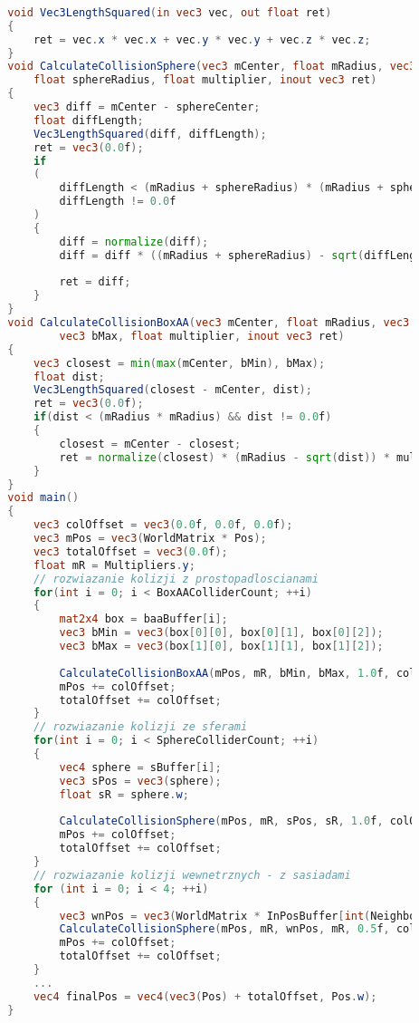 		\begin{lstlisting}[language=GLSL,caption={Rozwiązywanie kolizji.},label={lst_5_3}]
		
		void Vec3LengthSquared(in vec3 vec, out float ret)
		{
			ret = vec.x * vec.x + vec.y * vec.y + vec.z * vec.z;
		}
		void CalculateCollisionSphere(vec3 mCenter, float mRadius, vec3 sphereCenter, 
			float sphereRadius, float multiplier, inout vec3 ret)
		{
			vec3 diff = mCenter - sphereCenter;
			float diffLength;
			Vec3LengthSquared(diff, diffLength);
			ret = vec3(0.0f);
			if
			(
				diffLength < (mRadius + sphereRadius) * (mRadius + sphereRadius) &&
				diffLength != 0.0f
			)
			{
				diff = normalize(diff);
				diff = diff * ((mRadius + sphereRadius) - sqrt(diffLength)) * multiplier;
				
				ret = diff;
			}
		}
		void CalculateCollisionBoxAA(vec3 mCenter, float mRadius, vec3 bMin, 
				vec3 bMax, float multiplier, inout vec3 ret)
		{
			vec3 closest = min(max(mCenter, bMin), bMax);
			float dist;
			Vec3LengthSquared(closest - mCenter, dist);
			ret = vec3(0.0f);
			if(dist < (mRadius * mRadius) && dist != 0.0f)
			{
				closest = mCenter - closest;
				ret = normalize(closest) * (mRadius - sqrt(dist)) * multiplier;
			}
		}
		void main()
		{
			vec3 colOffset = vec3(0.0f, 0.0f, 0.0f);
			vec3 mPos = vec3(WorldMatrix * Pos);
			vec3 totalOffset = vec3(0.0f);
			float mR = Multipliers.y;
			// rozwiazanie kolizji z prostopadloscianami
			for(int i = 0; i < BoxAAColliderCount; ++i)
			{
				mat2x4 box = baaBuffer[i];
				vec3 bMin = vec3(box[0][0], box[0][1], box[0][2]);
				vec3 bMax = vec3(box[1][0], box[1][1], box[1][2]);
				
				CalculateCollisionBoxAA(mPos, mR, bMin, bMax, 1.0f, colOffset);
				mPos += colOffset;
				totalOffset += colOffset;
			}
			// rozwiazanie kolizji ze sferami
			for(int i = 0; i < SphereColliderCount; ++i)
			{
				vec4 sphere = sBuffer[i];
				vec3 sPos = vec3(sphere);
				float sR = sphere.w;
				
				CalculateCollisionSphere(mPos, mR, sPos, sR, 1.0f, colOffset);
				mPos += colOffset;
				totalOffset += colOffset;
			}
			// rozwiazanie kolizji wewnetrznych - z sasiadami
			for (int i = 0; i < 4; ++i)
			{
				vec3 wnPos = vec3(WorldMatrix * InPosBuffer[int(Neighbours[i])]);
				CalculateCollisionSphere(mPos, mR, wnPos, mR, 0.5f, colOffset);
				mPos += colOffset;
				totalOffset += colOffset;
			}
			...
			vec4 finalPos = vec4(vec3(Pos) + totalOffset, Pos.w);
		}
		
		\end{lstlisting}
			
